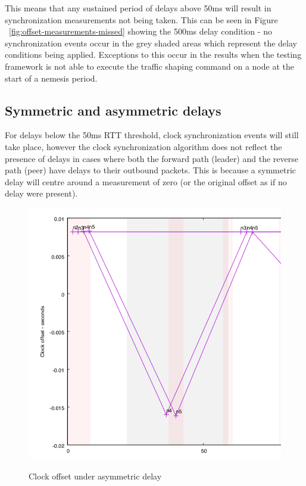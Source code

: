 \documentclass[11pt]{article} %
\theoremstyle{plain}
\theoremstyle{definition}
\begin{document}
This means that any sustained period of delays above 50ms will result in
synchronization measurements not being taken. This can be seen in
Figure ~\ref{fig:offset-measurements-missed} showing the 500ms delay condition - no
synchronization events occur in the grey shaded areas which represent the delay
conditions being applied. Exceptions to this occur in the results when the
testing framework is not able to execute the traffic shaping command on a node
at the start of a nemesis period.

\subsection{Symmetric and asymmetric delays}

For delays below the 50ms RTT threshold, clock synchronization events will
still take place, however the clock synchronization algorithm does not reflect
the presence of delays in cases where both the forward path (leader) and
the reverse path (peer) have delays to their outbound packets. This is because
a symmetric delay will centre around a measurement of zero (or the original
offset as if no delay were present).

\begin{figure}
  \caption{Clock offset under asymmetric delay}
  \includegraphics[width=1\textwidth]{figures-for-publication/clock-offset-example.png}
  \label{fig:delayExample}
\end{figure}
\end{document}
